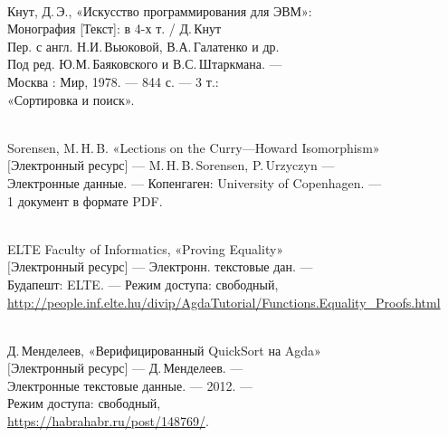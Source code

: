 
\renewcommand{\section}[2]{}
\begin{thebibliography}{9999}

 \ \\
	Кнут, Д.\,Э., «Искусство программирования для ЭВМ»: \\
	Монография [Текст]: в 4-х т. / Д.\,Кнут\scolon \\
	Пер. с англ. Н.И.\,Вьюковой, В.А.\,Галатенко и др.\scolon \\
	Под ред. Ю.М.\,Баяковского и В.С.\,Штаркмана. — \\
	Москва : Мир, 1978. — 844 с. — 3 т.: \\
	«Сортировка и поиск».	

 \ \\
	 Sorensen, M.\,H.\,B. «Lections on the Curry—Howard Isomorphism» \\
	$[$Электронный ресурс$]$ — M.\,H.\,B.\,Sorensen, P.\,Urzyczyn — \\
	Электронные данные. — Копенгаген: University of Copenhagen. — \\
	1 документ в формате PDF.

 \ \\
	ELTE Faculty of Informatics, «Proving Equality» \\
	$[$Электронный ресурс$]$ — Электронн. текстовые дан. — \\
	Будапешт: ELTE. — Режим доступа: свободный, \\
	\url{http://people.inf.elte.hu/divip/AgdaTutorial/Functions.Equality_Proofs.html}\scolon

 \ \\
	Д.\,Менделеев, «Верифицированный QuickSort на Agda» \\
	$[$Электронный ресурс$]$ — Д.\,Менделеев. — \\
	Электронные текстовые данные. — 2012. — \\
	 Режим доступа: свободный, \\
	\url{https://habrahabr.ru/post/148769/}.

\end{thebibliography}